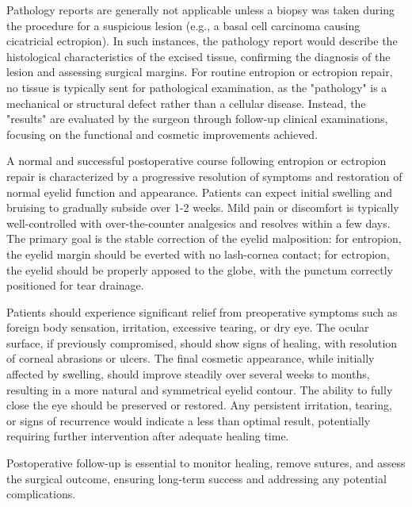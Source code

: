 Pathology reports are generally not applicable unless a biopsy was taken during the procedure for a suspicious lesion (e.g., a basal cell carcinoma causing cicatricial ectropion). In such instances, the pathology report would describe the histological characteristics of the excised tissue, confirming the diagnosis of the lesion and assessing surgical margins. For routine entropion or ectropion repair, no tissue is typically sent for pathological examination, as the "pathology" is a mechanical or structural defect rather than a cellular disease. Instead, the "results" are evaluated by the surgeon through follow-up clinical examinations, focusing on the functional and cosmetic improvements achieved.

A normal and successful postoperative course following entropion or ectropion repair is characterized by a progressive resolution of symptoms and restoration of normal eyelid function and appearance. Patients can expect initial swelling and bruising to gradually subside over 1-2 weeks. Mild pain or discomfort is typically well-controlled with over-the-counter analgesics and resolves within a few days. The primary goal is the stable correction of the eyelid malposition: for entropion, the eyelid margin should be everted with no lash-cornea contact; for ectropion, the eyelid should be properly apposed to the globe, with the punctum correctly positioned for tear drainage.

Patients should experience significant relief from preoperative symptoms such as foreign body sensation, irritation, excessive tearing, or dry eye. The ocular surface, if previously compromised, should show signs of healing, with resolution of corneal abrasions or ulcers. The final cosmetic appearance, while initially affected by swelling, should improve steadily over several weeks to months, resulting in a more natural and symmetrical eyelid contour. The ability to fully close the eye should be preserved or restored. Any persistent irritation, tearing, or signs of recurrence would indicate a less than optimal result, potentially requiring further intervention after adequate healing time.

Postoperative follow-up is essential to monitor healing, remove sutures, and assess the surgical outcome, ensuring long-term success and addressing any potential complications.


